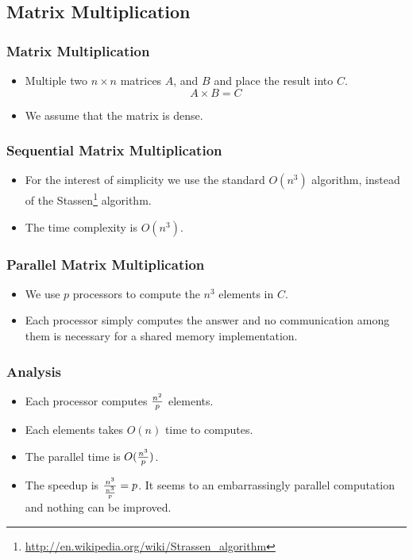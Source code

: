 \documentclass{beamer}
\begin{document}
\begin{CJK}{UTF8}{bsmi}
\subsection{Matrix Multiplication}

\begin{frame}
\frametitle{Matrix Multiplication}
\begin{itemize}
\item Multiple two $n \times n$ matrices $A$, and $B$ and place the
  result into $C$.
\begin{equation}
A \times B = C
\end{equation}
\item We assume that the matrix is dense.
\end{itemize}
\end{frame}

\begin{frame}
\frametitle{Sequential Matrix Multiplication}
\begin{itemize}
\item For the interest of simplicity we use the standard $O(n^3)$
  algorithm, instead of the
  Stassen\footnote{\url{http://en.wikipedia.org/wiki/Strassen_algorithm}}
  algorithm.
\item The time complexity is $O(n^3)$.
\end{itemize}
\end{frame}

\begin{frame}
\frametitle{Parallel Matrix Multiplication}
\begin{itemize}
\item We use $p$ processors to compute the $n^3$ elements in $C$.
\item Each processor simply computes the answer and no communication
  among them is necessary for a shared memory implementation. 
\end{itemize}
\end{frame}

\begin{frame}
\frametitle{Analysis}
\begin{itemize}
\item Each processor computes ${n^2 \over p}$ elements. 
\item Each elements takes $O(n)$ time to computes.
\item The parallel time is $O({n^3 \over p})$.
\item The speedup is ${n^3 \over {n^3 \over p}} = p$.  It seems to an
  embarrassingly parallel computation and nothing can be improved.
\end{itemize}
\end{frame}


\end{CJK}
\end{document}
